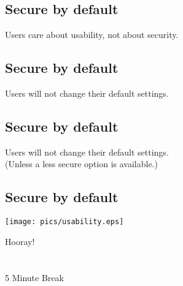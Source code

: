 \documentclass[xga]{xdvislides}
\begin{document}
\subsection{Secure by default}
\vspace{.5in}
\Huge
\begin{center}
Users care about usability, not about security.
\end{center}
\Normalsize

\subsection{Secure by default}
\vspace{.5in}
\Huge
\begin{center}
Users will not change their default settings.
\end{center}
\Normalsize

\subsection{Secure by default}
\vspace{.5in}
\Huge
\begin{center}
Users will not change their default settings. \\
\Normalsize
(Unless a less secure option is available.)
\end{center}

\subsection{Secure by default}
\vspace*{\fill}
\begin{center}
	\texttt{[image: pics/usability.eps]} \\
\end{center}
\vspace*{\fill}

\vspace*{\fill}
\newpage
\vspace*{\fill}
\begin{center}
    \Hugesize
        Hooray! \\ [1em]
    \hspace*{5mm}
    \blueline\\
    \hspace*{5mm}\\
        5 Minute Break
\end{center}
\vspace*{\fill}
\end{document}

